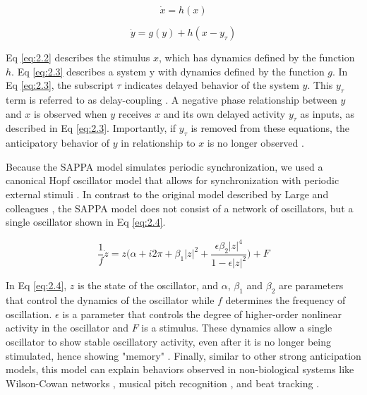 \documentclass{report}
\begin{document}
\begin{equation}
\dot{x}=h(x) \label{eq:2.2}
\end{equation}

\begin{equation}
\dot{y}=g(y)+h(x-y_\tau) \label{eq:2.3}
\end{equation}

Eq \eqref{eq:2.2} describes the stimulus $x$, which has dynamics defined by the function $h$. Eq \eqref{eq:2.3} describes a system y with dynamics defined by the function $g$. In Eq \eqref{eq:2.3}, the subscript $\tau$ indicates delayed behavior of the system $y$. This $y_\tau$ term is referred to as delay-coupling \cite{boccaletti2001space, stepp2015muddle}. A negative phase relationship between $y$ and $x$ is observed when $y$ receives $x$ and its own delayed activity $y_\tau$ as inputs, as described in Eq \eqref{eq:2.3}. Importantly, if $y_\tau$ is removed from these equations, the anticipatory behavior of $y$ in relationship to $x$ is no longer observed \cite{stepp2015muddle}.

Because the SAPPA model simulates periodic synchronization, we used a canonical Hopf oscillator model that allows for synchronization with periodic external stimuli \cite{large2010canonical}. In contrast to the original model described by Large and colleagues \cite{large2010canonical}, the SAPPA model does not consist of a network of oscillators, but a single oscillator shown in Eq \eqref{eq:2.4}. 

\begin{equation}
\frac{1}{f}\dot{z} = z\bigg(\alpha + i2\pi + \beta_1|z|^2 + \frac{\epsilon\beta_2|z|^4}{1-\epsilon|z|^2}\bigg) + F \label{eq:2.4}
\end{equation}

In Eq \eqref{eq:2.4}, $z$ is the state of the oscillator, and $\alpha$, $\beta_1$ and $\beta_2$ are parameters that control the dynamics of the oscillator while $f$ determines the frequency of oscillation. $\epsilon$ is a parameter that controls the degree of higher-order nonlinear activity in the oscillator and $F$ is a stimulus. These dynamics allow a single oscillator to show stable oscillatory activity, even after it is no longer being stimulated, hence showing "memory" \cite{kim2015signal}. Finally, similar to other strong anticipation models, this model can explain behaviors observed in non-biological systems like Wilson-Cowan networks \cite{large2010canonical}, musical pitch recognition \cite{large2010dynamical}, and beat tracking \cite{large2015neural}.
\end{document}
